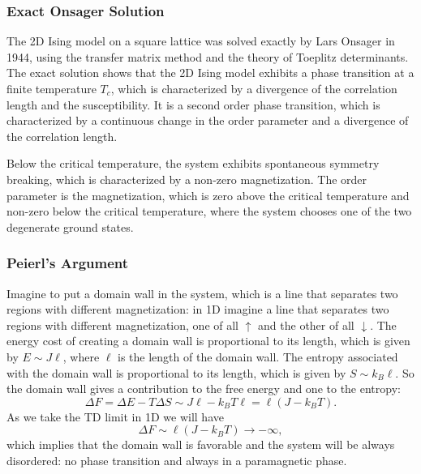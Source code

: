 \subsubsection{Exact Onsager Solution}

The 2D Ising model on a square lattice was solved exactly by Lars Onsager in 1944, using the transfer matrix method and the theory of Toeplitz determinants. The exact solution shows that the 2D Ising model exhibits a phase transition at a finite temperature \(T_c\), which is characterized by a divergence of the correlation length and the susceptibility. It is a second order phase transition, which is characterized by a continuous change in the order parameter and a divergence of the correlation length.

Below the critical temperature, the system exhibits spontaneous symmetry breaking, which is characterized by a non-zero magnetization. The order parameter is the magnetization, which is zero above the critical temperature and non-zero below the critical temperature, where the system chooses one of the two degenerate ground states.

\subsubsection{Peierl's Argument}

Imagine to put a domain wall in the system, which is a line that separates two regions with different magnetization: in 1D imagine a line that separates two regions with different magnetization, one of all \(\uparrow\) and the other of all \(\downarrow\). The energy cost of creating a domain wall is proportional to its length, which is given by \(E \sim J \ell\), where \(\ell\) is the length of the domain wall. The entropy associated with the domain wall is proportional to its length, which is given by \(S \sim k_B \ell\). So the domain wall gives a contribution to the free energy and one to the entropy:
\[
    \Delta F = \Delta E - T \Delta S \sim J \ell - k_B T \ell = \ell (J - k_B T).
\]
As we take the TD limit in 1D we will have
\[
    \Delta F \sim \ell (J - k_B T) \to -\infty,
\]
which implies that the domain wall is favorable and the system will be always disordered: no phase transition and always in a paramagnetic phase.

